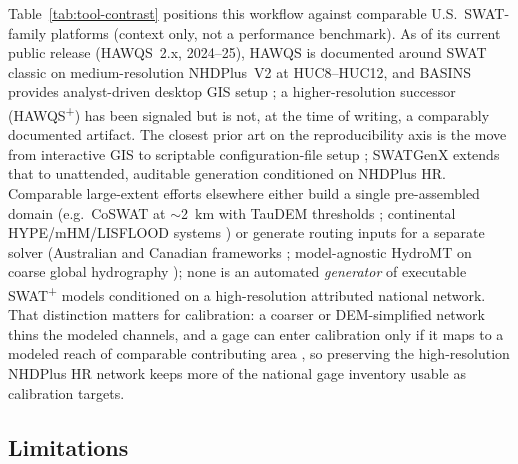 Table~\ref{tab:tool-contrast} positions this workflow against comparable U.S.\ SWAT-family platforms (context only, not a performance benchmark). As of its current public release (HAWQS~2.x, 2024--25), HAWQS is documented around SWAT classic on medium-resolution NHDPlus~V2 at HUC8--HUC12, and BASINS provides analyst-driven desktop GIS setup \citep{Yen2016HAWQS, EPABASINSFramework}; a higher-resolution successor (HAWQS\textsuperscript{+}) has been signaled but is not, at the time of writing, a comparably documented artifact. The closest prior art on the reproducibility axis is the move from interactive GIS \citep{Dile2016QSWAT} to scriptable configuration-file setup \citep{Chawanda2020SWATPlusAW}; SWATGenX extends that to unattended, auditable generation conditioned on NHDPlus HR. Comparable large-extent efforts elsewhere either build a single pre-assembled domain (e.g.\ CoSWAT at $\sim$2~km with TauDEM thresholds \citep{Chawanda2025CoSWAT}; continental HYPE/mHM/LISFLOOD systems \citep{Arheimer2020WorldWideHYPE, Samaniego2010mHM, VanDerKnijff2010LISFLOOD}) or generate routing inputs for a separate solver (Australian and Canadian frameworks \citep{Welsh2013Source, Craig2020Raven, Han2023BasinMaker}; model-agnostic HydroMT on coarse global hydrography \citep{Eilander2023HydroMT}); none is an automated \emph{generator} of executable SWAT\textsuperscript{+} models conditioned on a high-resolution attributed national network. That distinction matters for calibration: a coarser or DEM-simplified network thins the modeled channels, and a gage can enter calibration only if it maps to a modeled reach of comparable contributing area \citep{Jha2004Subdivision, Chaplot2005DEMmesh}, so preserving the high-resolution NHDPlus HR network keeps more of the national gage inventory usable as calibration targets.

\begin{table}[htbp]
  \centering
  \caption{Qualitative positioning relative to comparable U.S. SWAT-family decision-support workflows (not a performance benchmark).}
  \label{tab:tool-contrast}
  \footnotesize
  \setlength{\tabcolsep}{4pt}
  \renewcommand{\arraystretch}{1.18}
\end{table}

\subsection{Limitations}

